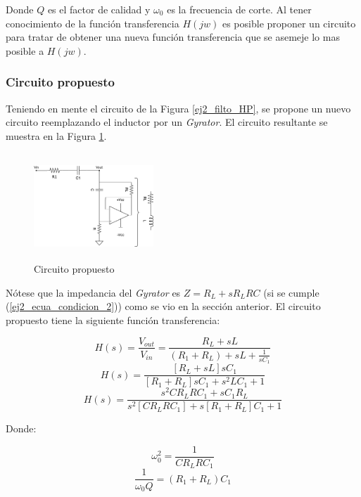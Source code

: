 \documentclass[12pt,a4paper]{article}
\begin{document}
Donde $Q$ es el factor de calidad y $\omega_0$ es la frecuencia de corte.      
Al tener conocimiento de la función transferencia $H(jw)$ es posible proponer un circuito para tratar de obtener una nueva función transferencia que se asemeje lo mas posible a $H(jw)$. 

\subsubsection{Circuito propuesto}
Teniendo en mente el circuito de la Figura \ref{ej2_filto_HP}, se propone un nuevo circuito reemplazando el inductor por un \textit{Gyrator}. El circuito resultante se muestra en la Figura \ref{fig:ej2_HP_propuesto}. 

\begin{figure}[!]                                                       
    \centering\includegraphics[width=0.4\textwidth, height=4cm]{Resources/ej2_hp_gyrator.png}
    \caption{Circuito propuesto}
    \label{fig:ej2_HP_propuesto}
    \end{figure}

Nótese que la impedancia del \textit{Gyrator} es $Z = R_L + sR_L R C$ (si se cumple (\ref{ej2_ecua_condicion_2})) como se vio en la sección anterior. El circuito propuesto tiene la siguiente función transferencia:

\begin{displaymath} H(s)= \frac{V_{out}}{V_{in}} = \frac{R_L + sL}{(R_1 + R_L) +sL + \frac{1}{sC_1}} \end{displaymath}  
\begin{displaymath} H(s)= \frac{[R_L + sL]sC_1}{[R_1 + R_L]sC_1 +s^2LC_1 + 1} \end{displaymath}
\begin{displaymath} H(s)= \frac{s^2CR_LRC_1 + sC_1R_L}{s^2[CR_LRC_1] + s[R_1 + R_L]C_1 + 1} \end{displaymath}

Donde:

\begin{displaymath} \omega_0^2= \frac{1}{CR_LRC_1} \end{displaymath}  
\begin{displaymath} \frac{1}{\omega_0 Q}= (R_1 + R_L) C_1 \end{displaymath}  
\end{document}
